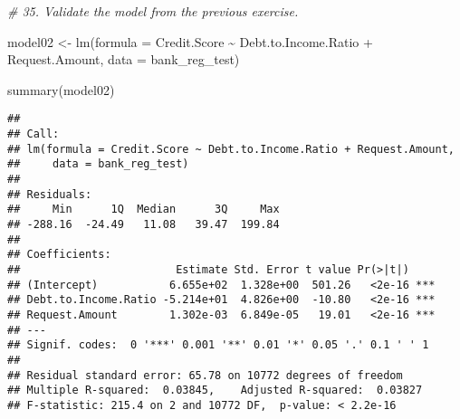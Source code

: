 \documentclass[
]{article}
\newenvironment{Shaded}{\begin{snugshade}}{\end{snugshade}}
\newcommand{\AttributeTok}[1]{\textcolor[rgb]{0.77,0.63,0.00}{#1}}
\newcommand{\CommentTok}[1]{\textcolor[rgb]{0.56,0.35,0.01}{\textit{#1}}}
\newcommand{\FunctionTok}[1]{\textcolor[rgb]{0.00,0.00,0.00}{#1}}
\newcommand{\NormalTok}[1]{#1}
\newcommand{\OtherTok}[1]{\textcolor[rgb]{0.56,0.35,0.01}{#1}}
\newcommand{\SpecialCharTok}[1]{\textcolor[rgb]{0.00,0.00,0.00}{#1}}
\begin{document}
\begin{Shaded}
\begin{Highlighting}[]
\CommentTok{\# 35. Validate the model from the previous exercise.}

\NormalTok{model02 }\OtherTok{\textless{}{-}} \FunctionTok{lm}\NormalTok{(}\AttributeTok{formula =}\NormalTok{ Credit.Score }\SpecialCharTok{\textasciitilde{}}\NormalTok{ Debt.to.Income.Ratio }\SpecialCharTok{+}\NormalTok{ Request.Amount,}
              \AttributeTok{data =}\NormalTok{ bank\_reg\_test)}

\FunctionTok{summary}\NormalTok{(model02)}
\end{Highlighting}
\end{Shaded}

\begin{verbatim}
## 
## Call:
## lm(formula = Credit.Score ~ Debt.to.Income.Ratio + Request.Amount, 
##     data = bank_reg_test)
## 
## Residuals:
##     Min      1Q  Median      3Q     Max 
## -288.16  -24.49   11.08   39.47  199.84 
## 
## Coefficients:
##                        Estimate Std. Error t value Pr(>|t|)    
## (Intercept)           6.655e+02  1.328e+00  501.26   <2e-16 ***
## Debt.to.Income.Ratio -5.214e+01  4.826e+00  -10.80   <2e-16 ***
## Request.Amount        1.302e-03  6.849e-05   19.01   <2e-16 ***
## ---
## Signif. codes:  0 '***' 0.001 '**' 0.01 '*' 0.05 '.' 0.1 ' ' 1
## 
## Residual standard error: 65.78 on 10772 degrees of freedom
## Multiple R-squared:  0.03845,    Adjusted R-squared:  0.03827 
## F-statistic: 215.4 on 2 and 10772 DF,  p-value: < 2.2e-16
\end{verbatim}
\end{document}
